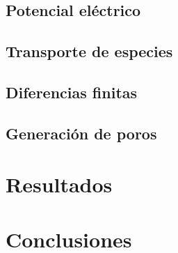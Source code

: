 \documentclass[11pt,a4paper,twoside]{tesis}
\begin{document}
\section{Potencial eléctrico}

\section{Transporte de especies}

\section{Diferencias finitas}

\section{Generación de poros}



\chapter{Resultados}

\chapter{Conclusiones}

\backmatter
%
\end{document}
